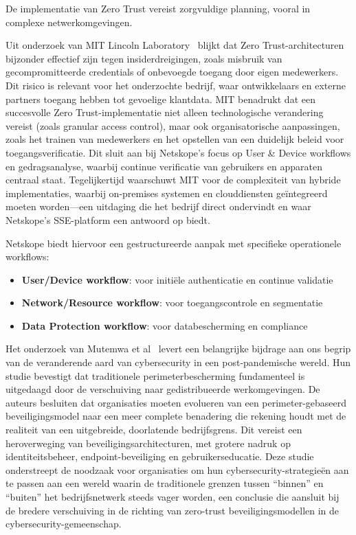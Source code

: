 De implementatie van Zero Trust vereist zorgvuldige planning, vooral in complexe netwerkomgevingen.


Uit onderzoek van MIT Lincoln Laboratory~\autocite{MIT2022} blijkt dat Zero Trust-architecturen bijzonder effectief zijn tegen insiderdreigingen, zoals misbruik van gecompromitteerde credentials of onbevoegde toegang door eigen medewerkers. 
Dit risico is relevant voor het onderzochte bedrijf, waar ontwikkelaars en externe partners toegang hebben tot gevoelige klantdata. 
MIT benadrukt dat een succesvolle Zero Trust-implementatie niet alleen technologische verandering vereist (zoals granular access control), maar ook organisatorische aanpassingen, zoals het trainen van medewerkers en het opstellen van een duidelijk beleid voor toegangsverificatie. 
Dit sluit aan bij Netskope’s focus op User \& Device workflows en gedragsanalyse, waarbij continue verificatie van gebruikers en apparaten centraal staat. 
Tegelijkertijd waarschuwt MIT voor de complexiteit van hybride implementaties, waarbij on-premises systemen en clouddiensten geïntegreerd moeten worden—een uitdaging die het bedrijf direct ondervindt en waar Netskope’s SSE-platform een antwoord op biedt.

Netskope biedt hiervoor een gestructureerde aanpak met specifieke operationele workflows:

\begin{itemize}
  \item \textbf{User/Device workflow}: voor initiële authenticatie en continue validatie
  \item \textbf{Network/Resource workflow}: voor toegangscontrole en segmentatie
  \item \textbf{Data Protection workflow}: voor databescherming en compliance
\end{itemize}

Het onderzoek van Mutemwa et al~\autocite{ACM2021} levert een belangrijke bijdrage aan ons begrip van de veranderende aard van cybersecurity in een post-pandemische wereld. Hun studie bevestigt dat traditionele perimeterbescherming fundamenteel is uitgedaagd door de verschuiving naar gedistribueerde werkomgevingen.
De auteurs besluiten dat organisaties moeten evolueren van een perimeter-gebaseerd beveiligingsmodel naar een meer complete benadering die rekening houdt met de realiteit van een uitgebreide, doorlatende bedrijfsgrens. Dit vereist een heroverweging van beveiligingsarchitecturen, met grotere nadruk op identiteitsbeheer, endpoint-beveiliging en gebruikerseducatie.
Deze studie onderstreept de noodzaak voor organisaties om hun cybersecurity-strategieën aan te passen aan een wereld waarin de traditionele grenzen tussen “binnen” en “buiten” het bedrijfsnetwerk steeds vager worden, een conclusie die aansluit bij de bredere verschuiving in de richting van zero-trust beveiligingsmodellen in de cybersecurity-gemeenschap.